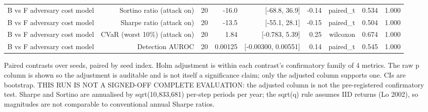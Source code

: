\begin{table}[htbp]
\begin{tabular}{lrrrrrrrr}
    B vs F   adversary cost model & Sortino ratio (attack on) & 20 & -16.0 & [-68.8, 36.9] & -0.14 & paired\_t & 0.534 & 1.000 \\
    B vs F   adversary cost model & Sharpe ratio (attack on) & 20 & -13.5 & [-55.1, 28.1] & -0.15 & paired\_t & 0.504 & 1.000 \\
    B vs F   adversary cost model & CVaR (worst 10\%) (attack on) & 20 & 1.84 & [-0.783, 5.39] & 0.25 & wilcoxon & 0.674 & 1.000 \\
    B vs F   adversary cost model & Detection AUROC & 20 & 0.00125 & [-0.00300, 0.00551] & 0.14 & paired\_t & 0.545 & 1.000 \\
    \bottomrule
  \end{tabular}
  \begin{minipage}{\linewidth}\vspace{4pt}\footnotesize Paired contrasts over seeds, paired by seed index. Holm adjustment is within each contrast's confirmatory family of 4 metrics. The raw p column is shown so the adjustment is auditable and is not itself a significance claim; only the adjusted column supports one. CIs are bootstrap. THIS RUN IS NOT A SIGNED-OFF COMPLETE EVALUATION: the adjusted column is not the pre-registered confirmatory test. Sharpe and Sortino are annualised by sqrt(10,833,681) per-step periods per year; the sqrt(q) rule assumes IID returns (Lo 2002), so magnitudes are not comparable to conventional annual Sharpe ratios.\end{minipage}
\end{table}
